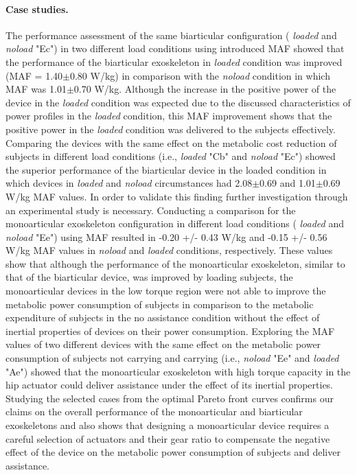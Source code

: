 \documentclass[10pt,letterpaper]{article}
\begin{document}
\paragraph{Case studies.} The performance assessment of the same biarticular configuration ( {\it loaded} and {\it noload} "Ec") in two different load conditions using introduced MAF showed that the performance of the biarticular exoskeleton in {\it loaded} condition was improved (MAF = 1.40$\pm$0.80 W/kg) in comparison with the {\it noload} condition in which MAF was 1.01$\pm$0.70 W/kg. Although the increase in the positive power of the device in the {\it loaded} condition was expected due to the discussed characteristics of power profiles in the {\it loaded} condition, this MAF improvement shows that the positive power in the {\it loaded} condition was delivered to the subjects effectively. Comparing the devices with the same effect on the metabolic cost reduction of subjects in different load conditions (i.e., {\it loaded} "Cb" and {\it noload} "Ec") showed the superior performance of the biarticular device in the loaded condition in which devices in {\it loaded} and {\it noload} circumstances had 2.08$\pm$0.69 and 1.01$\pm$0.69 W/kg MAF values. In order to validate this finding  further investigation through an experimental study is necessary.
Conducting a comparison for the monoarticular exoskeleton configuration in different load conditions ( {\it loaded} and {\it noload} "Ee") using MAF resulted in -0.20 +/- 0.43 W/kg and -0.15 +/- 0.56 W/kg MAF values in {\it noload} and {\it loaded} conditions, respectively. These values show that although the performance of the monoarticular exoskeleton, similar to that of the biarticular device, was improved by loading subjects, the monoarticular devices in the low torque region were not able to improve the metabolic power consumption of subjects in comparison to the metabolic expenditure of subjects in the no assistance condition without the effect of inertial properties of devices on their power consumption. Exploring the MAF values of two different devices with the same effect on the metabolic power consumption of subjects not carrying and carrying (i.e., {\it noload} "Ee" and {\it loaded} "Ae") showed that the monoarticular exoskeleton with high torque capacity in the hip actuator could deliver assistance under the effect of its inertial properties.\\
Studying the selected cases from the optimal Pareto front curves confirms our claims on the overall performance of the monoarticular and biarticular exoskeletons and also shows that designing a monoarticular device requires a careful selection of actuators and their gear ratio to compensate the negative effect of the device on the metabolic power consumption of subjects and deliver assistance.
\end{document}
